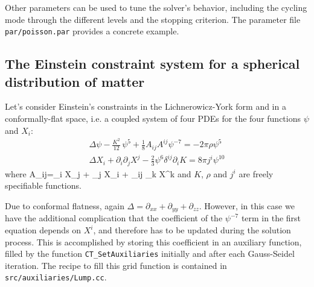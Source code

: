 Other parameters can be used to tune the solver's behavior, 
including the cycling mode through the different levels and the
stopping criterion. The parameter file \texttt{par/poisson.par}
provides a concrete example.

\subsection{The Einstein constraint system for a spherical distribution of matter}
Let's consider Einstein's constraints in the Lichnerowicz-York form
and in a conformally-flat space, 
i.e. a coupled system of four PDEs for the four functions $\psi$ and 
$X_i$:
\begin{eqnarray}
\label{eq:CTT}
 \Delta \psi - \frac{K^2}{12}\,\psi^5 + \frac{1}{8} {A}_{ij} {A}^{ij} \psi^{-7} = - 2 \pi \rho \psi^5 \\
 \Delta X_i + \partial_i \partial_j X^j - \frac{2}{3} \psi^6 \delta^{ij} \partial_i K = 8 \pi j^i \psi^{10}
\end{eqnarray} 
where
\beq
A_{ij}=\partial_i X_j + \partial_j X_i +  \; \delta_{ij} \partial_k X^k
\eeq
and $K$, $\rho$ and $j^i$ are freely specifiable functions.

Due to conformal flatness, again $\Delta = \partial_{xx} + \partial_{yy} 
+ \partial_{zz}$. However, in this case we have the additional
complication that the coefficient of the $\psi^{-7}$ term in the
first equation depends on $X^i$, and therefore has to be updated
during the solution process. This is accomplished by storing this 
coefficient in an auxiliary function, filled by the function
\texttt{CT\_SetAuxiliaries} initially and after each Gauss-Seidel 
iteration. The recipe to fill this grid function is contained in
\texttt{src/auxiliaries/Lump.cc}.

